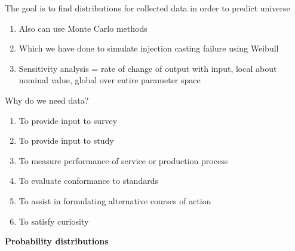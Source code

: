 \documentclass[aspectratio=1610,pdftex,dvipsnames,compress,xcolor={dvipsnames}]{beamer}
\begin{document}
\begin{frame}{The goal is to find distributions for collected data in order to predict universe}
    \begin{enumerate}[series=outerlist,topsep=0pt,itemsep=21pt,leftmargin=*,label=(\arabic*)]
        \item[]Also can use Monte Carlo methods  
        \item[]Which we have done to simulate injection casting failure using Weibull
        \item[]Sensitivity analysis = rate of change of output with input, local about nominal value, global over entire parameter space
    \end{enumerate}
\end{frame}


\begin{frame}{Why do we need data?}
    \begin{enumerate}[series=outerlist,topsep=0pt,itemsep=15pt,leftmargin=*,label=(\arabic*)]
        \item[]To provide input to survey 
        \item[]To provide input to study
        \item[]To measure performance of service or production process
        \item[]To evaluate conformance to standards
        \item[]To assist in formulating alternative courses of action
        \item[]To satisfy curiosity
    \end{enumerate}
\end{frame}


\begin{frame}[plain]{}
    \centering\LARGE\textbf{Probability distributions}
\end{frame}
\end{document}
